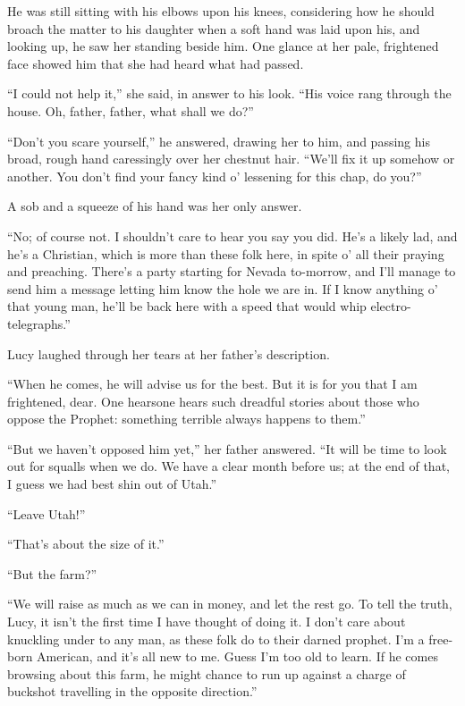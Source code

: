 \documentclass[12pt,english]{book}
\begin{document}
He was still sitting with his elbows upon his knees, considering how
he should broach the matter to his daughter when a soft hand was laid
upon his, and looking up, he saw her standing beside him. One glance
at her pale, frightened face showed him that she had heard what had
passed.

{}``I could not help it,'' she said, in answer to his look. {}``His
voice rang through the house. Oh, father, father, what shall we do?''

{}``Don't you scare yourself,'' he answered, drawing her to him,
and passing his broad, rough hand caressingly over her chestnut hair.
{}``We'll fix it up somehow or another. You don't find your fancy
kind o' lessening for this chap, do you?''

A sob and a squeeze of his hand was her only answer.

{}``No; of course not. I shouldn't care to hear you say you did.
He's a likely lad, and he's a Christian, which is more than these
folk here, in spite o' all their praying and preaching. There's a
party starting for Nevada to-morrow, and I'll manage to send him a
message letting him know the hole we are in. If I know anything o'
that young man, he'll be back here with a speed that would whip electro-telegraphs.''

Lucy laughed through her tears at her father's description.

{}``When he comes, he will advise us for the best. But it is for
you that I am frightened, dear. One hears\mdsh{---}one hears such
dreadful stories about those who oppose the Prophet: something terrible
always happens to them.''

{}``But we haven't opposed him yet,'' her father answered. {}``It
will be time to look out for squalls when we do. We have a clear month
before us; at the end of that, I guess we had best shin out of Utah.''

{}``Leave Utah!''

{}``That's about the size of it.''

{}``But the farm?''

{}``We will raise as much as we can in money, and let the rest go.
To tell the truth, Lucy, it isn't the first time I have thought of
doing it. I don't care about knuckling under to any man, as these
folk do to their darned prophet. I'm a free-born American, and it's
all new to me. Guess I'm too old to learn. If he comes browsing about
this farm, he might chance to run up against a charge of buckshot
travelling in the opposite direction.''
\end{document}
